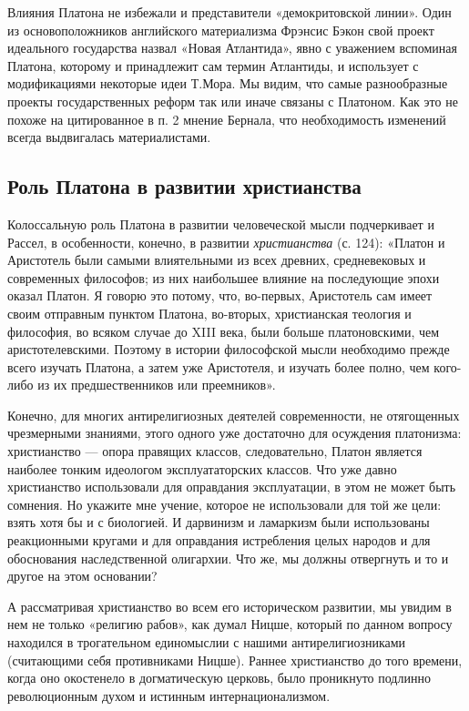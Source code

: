 Влияния Платона  не избежали  и представители  «демокритовской линии».
Один  из  основоположников   английского  материализма  Фрэнсис  Бэкон
свой  проект идеального  государства  назвал  «Новая Атлантида»,  явно
с  уважением  вспоминая Платона,  которому  и  принадлежит сам  термин
Атлантиды,  и использует  с  модификациями некоторые  идеи Т.Мора.  Мы
видим, что самые разнообразные  проекты государственных реформ так или
иначе  связаны с  Платоном. Как  это не  похоже на  цитированное в  п.
2  мнение  Бернала,  что необходимость  изменений  всегда  выдвигалась
материалистами.

\subsection{Роль Платона в развитии христианства}

Колоссальную роль Платона в развитии человеческой мысли подчеркивает и
Рассел, в  особенности, конечно, в развитии  \textit{христианства} (с.
124): «Платон и  Аристотель были самыми влиятельными  из всех древних,
средневековых  и  современных  философов; из  них  наибольшее  влияние
на  последующие  эпохи  оказал  Платон.  Я  говорю  это  потому,  что,
во-первых,  Аристотель  сам  имеет своим  отправным  пунктом  Платона,
во-вторых, христианская теология и философия, во всяком случае до XIII
века,  были  больше  платоновскими, чем  аристотелевскими.  Поэтому  в
истории философской  мысли необходимо прежде всего  изучать Платона, а
затем  уже Аристотеля,  и изучать  более  полно, чем  кого-либо из  их
предшественников или преемников».

Конечно,  для   многих  антирелигиозных  деятелей   современности,  не
отягощенных   чрезмерными  знаниями,   этого  одного   уже  достаточно
для   осуждения   платонизма:    христианство   ---   опора   правящих
классов,  следовательно,  Платон  является наиболее  тонким  идеологом
эксплуататорских классов. Что уже  давно христианство использовали для
оправдания эксплуатации, в этом не может быть сомнения. Но укажите мне
учение, которое  не использовали для  той же цели:  взять хотя бы  и с
биологией.  И дарвинизм  и  ламаркизм  были использованы  реакционными
кругами и для  оправдания истребления целых народов  и для обоснования
наследственной олигархии. Что  же, мы должны отвергнуть и  то и другое
на этом основании?

А  рассматривая христианство  во  всем его  историческом развитии,  мы
увидим  в нем  не только  «религию  рабов», как  думал Ницше,  который
по  данном  вопросу  находился  в трогательном  единомыслии  с  нашими
антирелигиозниками  (считающими   себя  противниками   Ницше).  Раннее
христианство  до того  времени, когда  оно окостенело  в догматическую
церковь,  было  проникнуто  подлинно революционным  духом  и  истинным
интернационализмом.

